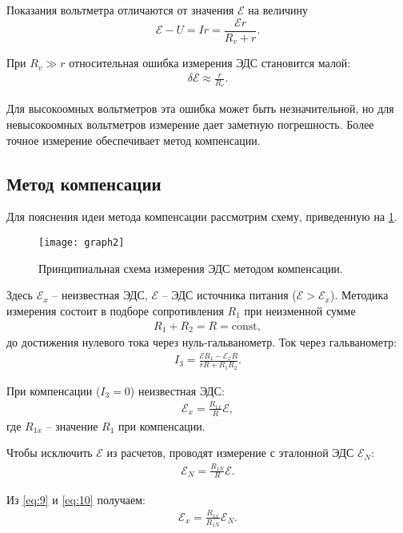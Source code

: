 Показания вольтметра отличаются от значения $\mathcal{E}$ на величину
\[
\mathcal{E} - U = I r = \frac{\mathcal{E} r}{R_v + r}.
\]

При $R_v \gg r$ относительная ошибка измерения ЭДС становится малой:
\begin{align} \label{eq:6}
	\delta\mathcal{E} \approx \frac{r}{R_v}.
\end{align}

Для высокоомных вольтметров эта ошибка может быть незначительной, но для невысокоомных вольтметров измерение дает заметную погрешность. Более точное измерение обеспечивает метод компенсации.

\subsection{Метод компенсации}
Для пояснения идеи метода компенсации рассмотрим схему, приведенную на \cref{fig:2}.

\begin{figure}[H]
	\centering
	\texttt{[image: graph2]}
	\caption{Принципиальная схема измерения ЭДС методом компенсации.}
	\label{fig:2}
\end{figure}

Здесь $\mathcal{E}_x$ -- неизвестная ЭДС, $\mathcal{E}$ -- ЭДС источника питания ($\mathcal{E} > \mathcal{E}_x$). Методика измерения состоит в подборе сопротивления $R_1$ при неизменной сумме
\begin{align} \label{eq:7}
	R_1 + R_2 = R = \text{const},
\end{align}
до достижения нулевого тока через нуль-гальванометр. Ток через гальванометр:
\begin{align} \label{eq:8}
	I_3 = \frac{\mathcal{E} R_1 - \mathcal{E}_x R}{rR + R_1 R_2}.
\end{align}

При компенсации ($I_3 = 0$) неизвестная ЭДС:
\begin{align} \label{eq:9}
	\mathcal{E}_x = \frac{R_{1x}}{R} \mathcal{E},
\end{align}
где $R_{1x}$ -- значение $R_1$ при компенсации.

Чтобы исключить $\mathcal{E}$ из расчетов, проводят измерение с эталонной ЭДС $\mathcal{E}_N$:
\begin{align} \label{eq:10}
	\mathcal{E}_N = \frac{R_{1N}}{R} \mathcal{E}.
\end{align}

Из \eqref{eq:9} и \eqref{eq:10} получаем:
\begin{align} \label{eq:11}
	\mathcal{E}_x = \frac{R_{1x}}{R_{1N}} \mathcal{E}_N.
\end{align}

